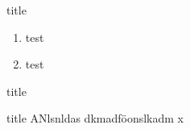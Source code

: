 \documentclass[aspectratio=1610, professionalfonts, 9pt]{beamer}
\begin{document}
\begin{frame}{title}
  \begin{enumerate}
	\item test
	\item test
  \end{enumerate}
\end{frame}

\begin{frame}{title}
  \begin{block}{title}
	ANlsnldas dkmadföonslkadm x
  \end{block}
\end{frame}
\end{document}
